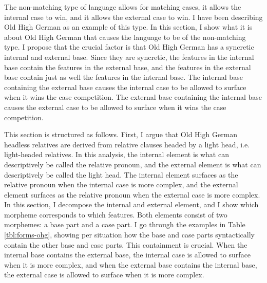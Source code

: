 The non-matching type of language allows for matching cases, it allows the internal case to win, and it allows the external case to win. I have been describing Old High German as an example of this type. In this section, I show what it is about Old High German that causes the language to be of the non-matching type. I propose that the crucial factor is that Old High German has a syncretic internal and external base. Since they are syncretic, the features in the internal base contain the features in the external base, and the features in the external base contain just as well the features in the internal base. The internal base containing the external base causes the internal case to be allowed to surface when it wins the case competition. The external base containing the internal base causes the external case to be allowed to surface when it wins the case competition.

This section is structured as follows. First, I argue that Old High German headless relatives are derived from relative clauses headed by a light head, i.e. light-headed relatives. In this analysis, the internal element is what can descriptively be called the relative pronoun, and the external element is what can descriptively be called the light head. The internal element surfaces as the relative pronoun when the internal case is more complex, and the external element surfaces as the relative pronoun when the external case is more complex. In this section, I decompose the internal and external element, and I show which morpheme corresponds to which features. Both elements consist of two morphemes: a base part and a case part. I go through the examples in Table \ref{tbl:forms-ohg}, showing per situation how the base and case parts syntactically contain the other base and case parts. This containment is crucial. When the internal base contains the external base, the internal case is allowed to surface when it is more complex, and when the external base contains the internal base, the external case is allowed to surface when it is more complex.

